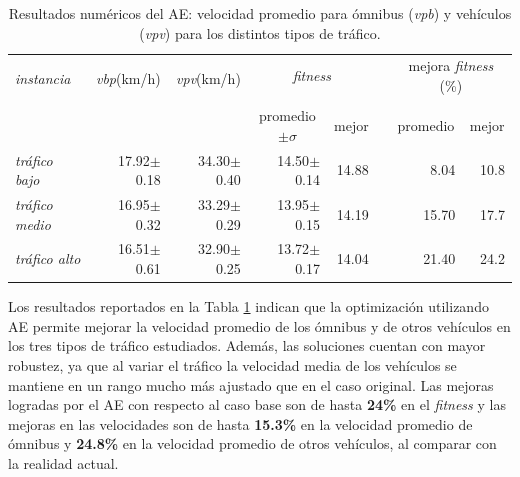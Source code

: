 

\begin{table}[H]
	\renewcommand{\arraystretch}{1.05}
\renewcommand{\tabcolsep}{4pt}
	\caption[Resultados numéricos del caso base.]{Resultados numéricos del AE: velocidad promedio para ómnibus (\textit{vpb}) y vehículos (\textit{vpv}) para los distintos tipos de tráfico.}
	\label{table:resultado_caso_algoritmo}
	\begin{tabular}{lrrrrrrr}
		\toprule
		\multirow{2}{*}{\textit{instancia}}&
		\multirow{2}{*}{\textit{vbp}(km/h)}&
		\multirow{2}{*}{\textit{vpv}(km/h)}&
		\multicolumn{2}{c}{\emph{fitness}}&  &
		\multicolumn{2}{c}{mejora \emph{fitness} (\%)}\\  
		\cline{4-5} \cline{7-8}\\[-9pt]
		&     &     & \multicolumn{1}{c}{promedio$\pm\sigma$} & \multicolumn{1}{c}{mejor} &  & \multicolumn{1}{c}{promedio} & \multicolumn{1}{c}{mejor} \\ 
		\midrule
		\textit{tráfico bajo} & 17.92$\pm$0.18 & 34.30$\pm$0.40 & 14.50$\pm$0.14 & 14.88 & & 8.04 & 10.8  \\
		\textit{tráfico medio} & 16.95$\pm$0.32 & 33.29$\pm$0.29 & 13.95$\pm$0.15 & 14.19 & & 15.70& 17.7\\
		\textit{tráfico alto} & 16.51$\pm$0.61  & 32.90$\pm$0.25& 13.72$\pm$0.17 & 14.04 & & 21.40& 24.2\\    
		\bottomrule        
	\end{tabular}
\end{table}


Los resultados reportados en la Tabla \ref{table:resultado_caso_algoritmo} indican que la optimización utilizando AE permite mejorar la velocidad promedio de los ómnibus y de otros vehículos en los tres tipos de tráfico estudiados. Además, las soluciones cuentan con mayor robustez, ya que al variar el tráfico la velocidad media de los vehículos se mantiene en un rango mucho más ajustado que en el caso original. Las mejoras logradas por el AE con respecto al caso base son de hasta \textbf{24\%} en el \emph{fitness} y las mejoras en las velocidades son de hasta \textbf{15.3\%} en la velocidad promedio de ómnibus y \textbf{24.8\%} en la velocidad promedio de otros vehículos, al comparar con la realidad actual.


